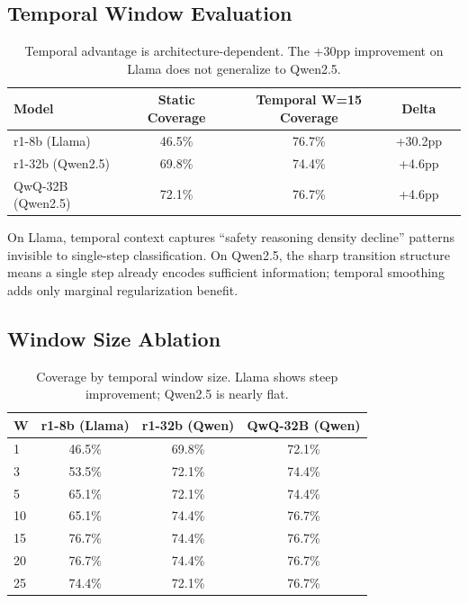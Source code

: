 \documentclass[11pt]{article}
\begin{document}
\subsection{Temporal Window Evaluation}

\begin{table}[h]
\centering
\caption{Temporal advantage is architecture-dependent. The +30pp improvement on Llama does not generalize to Qwen2.5.}
\label{tab:temporal}
\begin{tabular}{lcccc}
\toprule
Model & Static Coverage & Temporal W=15 Coverage & Delta \\
\midrule
r1-8b (Llama) & 46.5\% & 76.7\% & +30.2pp \\
r1-32b (Qwen2.5) & 69.8\% & 74.4\% & +4.6pp \\
QwQ-32B (Qwen2.5) & 72.1\% & 76.7\% & +4.6pp \\
\bottomrule
\end{tabular}
\end{table}

On Llama, temporal context captures ``safety reasoning density decline'' patterns invisible to single-step classification. On Qwen2.5, the sharp transition structure means a single step already encodes sufficient information; temporal smoothing adds only marginal regularization benefit.

\subsection{Window Size Ablation}

\begin{table}[h]
\centering
\caption{Coverage by temporal window size. Llama shows steep improvement; Qwen2.5 is nearly flat.}
\label{tab:window}
\begin{tabular}{lccc}
\toprule
W & r1-8b (Llama) & r1-32b (Qwen) & QwQ-32B (Qwen) \\
\midrule
1 & 46.5\% & 69.8\% & 72.1\% \\
3 & 53.5\% & 72.1\% & 74.4\% \\
5 & 65.1\% & 72.1\% & 74.4\% \\
10 & 65.1\% & 74.4\% & 76.7\% \\
15 & 76.7\% & 74.4\% & 76.7\% \\
20 & 76.7\% & 74.4\% & 76.7\% \\
25 & 74.4\% & 72.1\% & 76.7\% \\
\bottomrule
\end{tabular}
\end{table}
\end{document}

